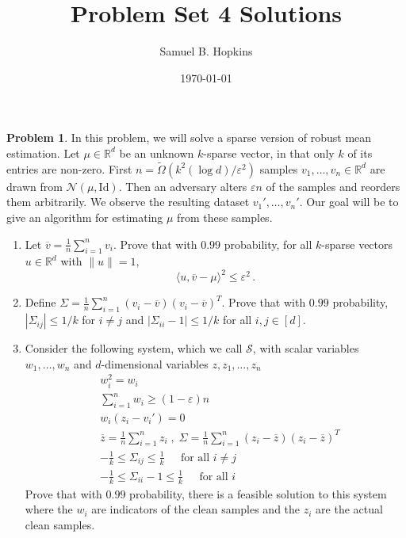 \documentclass[11pt]{article}
\title{Problem Set 4 Solutions}
\author{Samuel B. Hopkins}
\date{\today}
\theoremstyle{definition}
\newtheorem{problem}[theorem]{Problem}
\newcommand{\R}{\mathbb{R}} %
\renewcommand{\epsilon}{\varepsilon}
\newcommand{\Id}{\mathrm{Id}}
\begin{document}
\maketitle

\begin{problem}
  In this problem, we will solve a sparse version of robust mean estimation.  Let $\mu \in \R^d$ be an unknown $k$-sparse vector, in that only $k$ of its entries are non-zero.  First $n = \widetilde{\Omega}(k^2 (\log d)/\epsilon^2)$ samples $v_1, \dots, v_n \in \R^d$ are drawn from $\mathcal{N}(\mu, \Id)$. Then an adversary alters $\epsilon n$ of the samples and reorders them arbitrarily.  We observe the resulting dataset $v_1', \dots , v_n'$.   Our goal will be to give an algorithm for estimating $\mu$ from these samples.

  \begin{enumerate}[label=(\alph*)]
    \item Let $\overline{v} = \frac{1}{n} \sum_{i = 1}^n v_i$.  Prove that with $0.99$ probability, for all $k$-sparse vectors $u \in \R^d$ with $\| u \| = 1$,
    \[
    \langle u, \overline{v} - \mu \rangle^2 \leq \epsilon^2 \,.  
    \]
    \item Define $\Sigma = \frac{1}{n} \sum_{i = 1}^n (v_i - \overline{v}) (v_i - \overline{v})^T$. 
     Prove that with $0.99$ probability, $|\Sigma_{ij}| \leq 1/k$ for $i \neq j$ and $| \Sigma_{ii} - 1| \leq 1/k$ for all $i,j \in [d]$.
    \item Consider the following system, which we call $\mathcal{S}$, with scalar variables $w_1, \dots , w_n$ and $d$-dimensional variables $z, z_1, \dots ,  z_n$
    \[
    \begin{split}
    &w_i^2 = w_i \\
    & \sum_{i = 1}^n w_i \geq (1 - \epsilon) n \\
    &w_i(z_i - v_i') = 0 \\
    &\overline{z} =  \frac{1}{n} \sum_{i = 1}^n z_i \; , \; \Sigma = \frac{1}{n} \sum_{i = 1}^n (z_i - \overline{z}) (z_i - \overline{z})^T \\ 
    &-\frac{1}{k} \leq \Sigma_{ij} \leq \frac{1}{k}  \;\;\;\; \text{ for all } i \neq j  \\
    &-\frac{1}{k} \leq \Sigma_{ii} - 1 \leq \frac{1}{k} \;\;\;\; \text{ for all } i
    \end{split}
    \]
    Prove that with $0.99$ probability, there is a feasible solution to this system where the $w_i$ are indicators of the clean samples and the $z_i$ are the actual clean samples.

\end{enumerate}
\end{problem}
\end{document}
